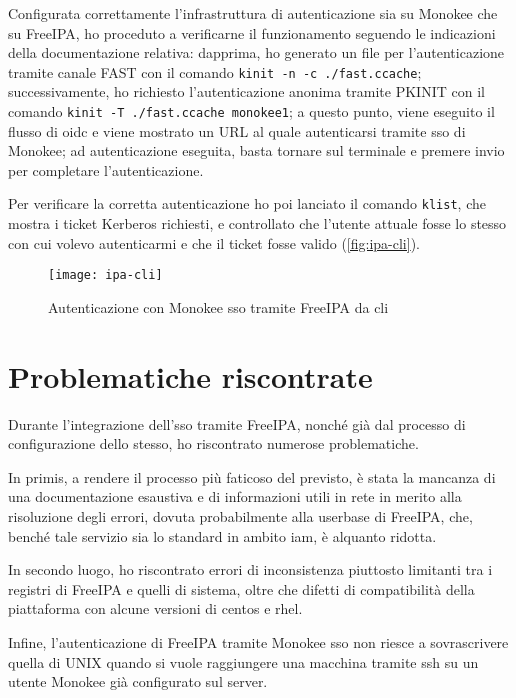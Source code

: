 Configurata correttamente l'infrastruttura di autenticazione sia su Monokee che su FreeIPA, ho proceduto a verificarne il funzionamento seguendo le indicazioni della documentazione relativa: dapprima, ho generato un file per l'autenticazione tramite canale FAST con il comando \texttt{kinit -n -c ./fast.ccache}; successivamente, ho richiesto l'autenticazione anonima tramite PKINIT con il comando \texttt{kinit -T ./fast.ccache monokee1}; a questo punto, viene eseguito il flusso di \acrshort{oidc} e viene mostrato un URL al quale autenticarsi tramite \acrshort{sso} di Monokee; ad autenticazione eseguita, basta tornare sul terminale e premere invio per completare l'autenticazione.

Per verificare la corretta autenticazione ho poi lanciato il comando \texttt{klist}, che mostra i ticket Kerberos richiesti, e controllato che l'utente attuale fosse lo stesso con cui volevo autenticarmi e che il ticket fosse valido (\autoref{fig:ipa-cli}).  

\begin{figure}[!h] 
    \centering 
    \texttt{[image: ipa-cli]} 
    \caption{Autenticazione con Monokee \acrshort{sso} tramite FreeIPA da \acrshort{cli}}
    \label{fig:ipa-cli}
\end{figure}


\section{Problematiche riscontrate}

Durante l'integrazione dell'\acrshort{sso} tramite FreeIPA, nonché già dal processo di configurazione dello stesso, ho riscontrato numerose problematiche.

In primis, a rendere il processo più faticoso del previsto, è stata la mancanza di una  documentazione esaustiva e di informazioni utili in rete in merito alla risoluzione degli errori, dovuta probabilmente alla userbase di FreeIPA, che, benché tale servizio sia lo standard in ambito \acrshort{iam}, è alquanto ridotta.

In secondo luogo, ho riscontrato errori di inconsistenza piuttosto limitanti tra i registri di FreeIPA e quelli di sistema, oltre che difetti di compatibilità della piattaforma con alcune versioni di \acrshort{centos} e \acrshort{rhel}.

Infine, l'autenticazione di FreeIPA tramite Monokee \acrshort{sso} non riesce a sovrascrivere quella di UNIX quando si vuole raggiungere una macchina tramite \acrshort{ssh} su un utente Monokee già configurato sul server. 

